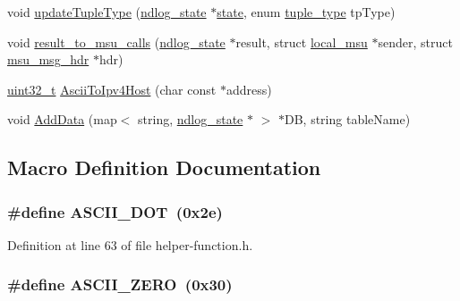 \begin{DoxyCompactItemize}
\item 
void \hyperlink{helper-function_8h_a67e3619fb8bab96644f4a6d3edf8b95e}{update\-Tuple\-Type} (\hyperlink{structndlog__state}{ndlog\-\_\-state} $\ast$\hyperlink{http__parser_8c_adc6e5733fc3c22f0a7b2914188c49c90}{state}, enum \hyperlink{model_8h_ae688e205096dad09ca010b144f151f40}{tuple\-\_\-type} tp\-Type)
\item 
void \hyperlink{helper-function_8h_ad1f32e269267b0398216cc0f5b9d7f65}{result\-\_\-to\-\_\-msu\-\_\-calls} (\hyperlink{structndlog__state}{ndlog\-\_\-state} $\ast$result, struct \hyperlink{structlocal__msu}{local\-\_\-msu} $\ast$sender, struct \hyperlink{structmsu__msg__hdr}{msu\-\_\-msg\-\_\-hdr} $\ast$hdr)
\item 
\hyperlink{msus_2webserver_2uthash_8h_a435d1572bf3f880d55459d9805097f62}{uint32\-\_\-t} \hyperlink{helper-function_8h_a1e2ed2e91118eb8872615e5c4ccdffdb}{Ascii\-To\-Ipv4\-Host} (char const $\ast$address)
\item 
void \hyperlink{helper-function_8h_acc79d85fb784ed49b7e0b94f0e980f8f}{Add\-Data} (map$<$ string, \hyperlink{structndlog__state}{ndlog\-\_\-state} $\ast$ $>$ $\ast$D\-B, string table\-Name)
\end{DoxyCompactItemize}


\subsection{Macro Definition Documentation}
\hypertarget{helper-function_8h_a6ec0f0cb1e0c4e317469e4103bec5fd5}{
\subsubsection[{A\-S\-C\-I\-I\-\_\-\-D\-O\-T}]{\setlength{\rightskip}{0pt plus 5cm}\#define A\-S\-C\-I\-I\-\_\-\-D\-O\-T~(0x2e)}}\label{helper-function_8h_a6ec0f0cb1e0c4e317469e4103bec5fd5}


Definition at line 63 of file helper-\/function.\-h.

\hypertarget{helper-function_8h_abde11a6ee98560227d0d3889da0408e4}{
\subsubsection[{A\-S\-C\-I\-I\-\_\-\-Z\-E\-R\-O}]{\setlength{\rightskip}{0pt plus 5cm}\#define A\-S\-C\-I\-I\-\_\-\-Z\-E\-R\-O~(0x30)}}\label{helper-function_8h_abde11a6ee98560227d0d3889da0408e4}



